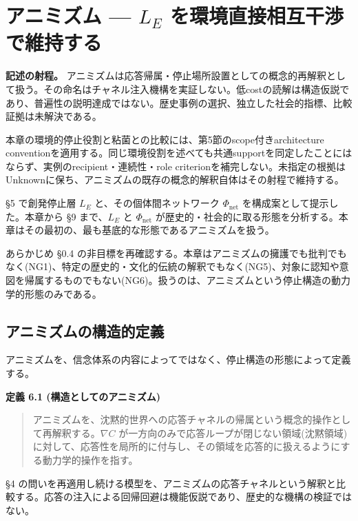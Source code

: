 \section{アニミズム — $L_E$ を環境直接相互干渉で維持する}

\noindent\textbf{記述の射程。} アニミズムは応答帰属・停止場所設置としての概念的再解釈として扱う。その命名はチャネル注入機構を実証しない。低costの読解は構造仮説であり、普遍性の説明達成ではない。歴史事例の選択、独立した社会的指標、比較証拠は未解決である。

本章の環境的停止役割と粘菌との比較には、第5節のscope付きarchitecture conventionを適用する。同じ環境役割を述べても共通supportを同定したことにはならず、実例のrecipient・連続性・role criterionを補完しない。未指定の根拠はUnknownに保ち、アニミズムの既存の概念的解釈自体はその射程で維持する。



\S{}5 で創発停止層 $L_E$ と、その個体間ネットワーク $\Phi_{\text{net}}$ を構成案として提示した。本章から \S{}9 まで、$L_E$ と $\Phi_{\text{net}}$ が歴史的・社会的に取る形態を分析する。本章はその最初の、最も基底的な形態であるアニミズムを扱う。

あらかじめ \S{}0.4 の非目標を再確認する。本章はアニミズムの擁護でも批判でもなく(NG1)、特定の歴史的・文化的伝統の解釈でもなく(NG5)、対象に認知や意図を帰属するものでもない(NG6)。扱うのは、アニミズムという停止構造の動力学的形態のみである。

\bigskip


\subsection{アニミズムの構造的定義}


アニミズムを、信念体系の内容によってではなく、停止構造の形態によって定義する。

\textbf{定義 6.1 (構造としてのアニミズム)}

\begin{quote}
アニミズムを、沈黙的世界への応答チャネルの帰属という概念的操作として再解釈する。$\nabla C$ が一方向のみで応答ループが閉じない領域(沈黙領域)に対して、応答性を局所的に付与し、その領域を応答的に扱えるようにする動力学的操作を指す。
\end{quote}


\S{}4 の問いを再適用し続ける模型を、アニミズムの応答チャネルという解釈と比較する。応答の注入による回帰回避は機能仮説であり、歴史的な機構の検証ではない。

